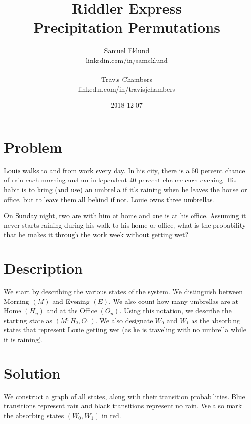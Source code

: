 \documentclass[12pt]{article}
\title{Riddler Express \\ Precipitation Permutations}
\author{Samuel Eklund\\linkedin.com/in/sameklund\\ \\Travis Chambers\\linkedin.com/in/travisjchambers}
\date{2018-12-07}
\begin{document}
\maketitle

\section{Problem}
Louie walks to and from work every day. In his city, there is a 50 percent chance of rain each morning and an independent 40 percent chance each evening. His habit is to bring (and use) an umbrella if it's raining when he leaves the house or office, but to leave them all behind if not. Louie owns three umbrellas.

On Sunday night, two are with him at home and one is at his office. Assuming it never starts raining during his walk to his home or office, what is the probability that he makes it through the work week without getting wet?

\section{Description}
We start by describing the various states of the system. We  distinguish between Morning $(M)$ and Evening $(E)$. We also count how many umbrellas are at Home $(H_{n})$ and at the Office $(O_{n})$. Using this notation, we describe the starting state as $(M; H_{2}, O_{1})$. We also designate $W_{0}$ and $W_{1}$ as the absorbing states that represent Louie getting wet (as he is traveling with no umbrella while it is raining).

\newpage

\section{Solution}
We construct a graph of all states, along with their transition probabilities. Blue transitions represent rain and black transitions represent no rain. We also mark the absorbing states $(W_{0}, W_{1})$ in red.
\end{document}
